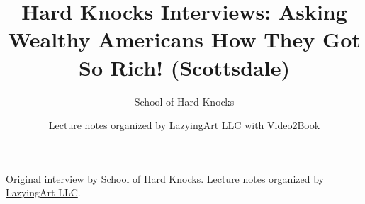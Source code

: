 \documentclass[11pt,oneside]{book}
\begin{document}
\frontmatter
\title{Hard Knocks Interviews: Asking Wealthy Americans How They Got So Rich! (Scottsdale)}
\author{School of Hard Knocks}
\date{Lecture notes organized by \href{https://lazying.art}{LazyingArt LLC} with \href{https://github.com/lachlanchen/Video2Book}{Video2Book}}
\maketitle
\begin{center}
\small Original interview by School of Hard Knocks. Lecture notes organized by \href{https://lazying.art}{LazyingArt LLC}.
\end{center}
\clearpage
\mainmatter

\end{document}
